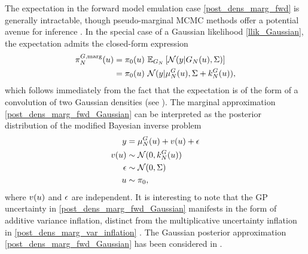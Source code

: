 \documentclass[12pt]{article}
\begin{document}
The expectation in the forward model emulation case 
\ref{post_dens_marg_fwd} is generally intractable, though pseudo-marginal MCMC methods offer a potential 
avenue for inference \cite{pseudoMarginalMCMC}. In the special case of a Gaussian likelihood \ref{llik_Gaussian}, 
the expectation admits the closed-form expression
\begin{align}
\fwdEmMargDens[\Ndesign](\Par) 
&= \priorDens(\Par) \ \E_{\fwdEm}\left[\Gaussian(\obs | \fwdEm[\Ndesign](\Par), \likPar) \right]
\nonumber \\
&= \priorDens(\Par) \ \Gaussian(\obs | \emMean[\Ndesign]{\fwd}(\Par), \likPar + \emKer[\Ndesign]{\fwd}(\Par)),
\label{post_dens_marg_fwd_Gaussian}
\end{align}
which follows immediately from the fact that the expectation is of the form of a convolution 
of two Gaussian densities (see ). 
The marginal approximation \ref{post_dens_marg_fwd_Gaussian}
can be interpreted as the posterior distribution of the modified Bayesian inverse problem 
\begin{align}
\obs &= \emMean[\Ndesign]{\fwd}(\Par) + v(\Par) + \noise \label{inv_prob_Gaussian_marginal_approx} \\
v(\Par) &\sim \Gaussian(0, \emKer[\Ndesign]{\fwd}(\Par)) \nonumber \\
\noise &\sim \Gaussian(0, \likPar) \nonumber \\
\Par &\sim \priorDens \nonumber, 
\end{align}
where $v(\Par)$ and $\noise$ are independent. It is interesting to note that the GP uncertainty in 
\ref{post_dens_marg_fwd_Gaussian} manifests in the form of additive variance inflation, distinct 
from the multiplicative uncertainty inflation in \ref{post_dens_marg_var_inflation} \cite{GP_PDE_priors}. 
The Gaussian posterior approximation \ref{post_dens_marg_fwd_Gaussian} has been considered in 
\cite{StuartTeck2, hydrologicalModel, GP_PDE_priors, GP_PDE_priors, CES, idealizedGCM, weightedIVAR}. 
\end{document}
